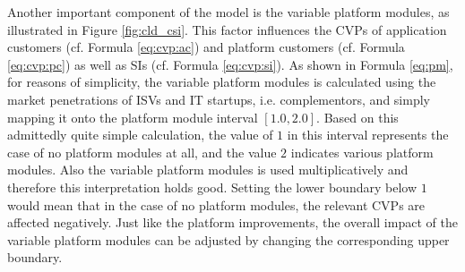 Another important component of the model is the variable platform modules, as illustrated in Figure \ref{fig:cld_csi}. This factor influences the \acp{CVP} of application customers (cf. Formula \ref{eq:cvp:ac}) and platform customers (cf. Formula \ref{eq:cvp:pc}) as well as \acp{SI} (cf. Formula \ref{eq:cvp:si}). As shown in Formula \ref{eq:pm}, for reasons of simplicity, the variable platform modules is calculated using the market penetrations of \acp{ISV} and \ac{IT} startups, i.e. complementors, and simply mapping it onto the platform module interval $[1.0,2.0]$. Based on this admittedly quite simple calculation, the value of $1$ in this interval represents the case of no platform modules at all, and the value $2$ indicates various platform modules. Also the variable platform modules is used multiplicatively and therefore this interpretation holds good. Setting the lower boundary below $1$ would mean that in the case of no platform modules, the relevant \acp{CVP} are affected negatively. Just like the platform improvements, the overall impact of the variable platform modules can be adjusted by changing the corresponding upper boundary.

